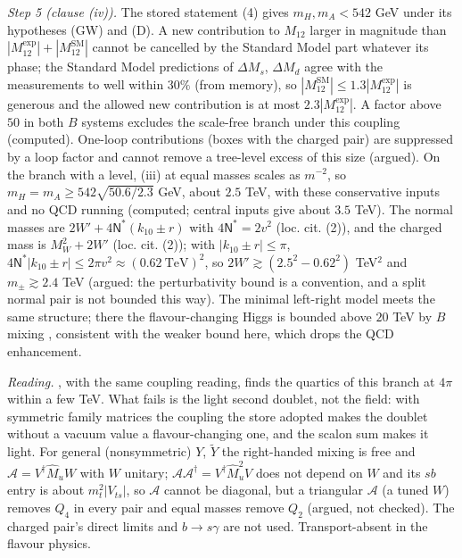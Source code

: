 \emph{Step 5 (clause (iv)).} The stored statement (4) gives $m_{H}, m_{A} < 542$ GeV under its hypotheses (GW) and (D). A new contribution to $M_{12}$ larger in magnitude than $|M_{12}^{\mathrm{exp}}| + |M_{12}^{\mathrm{SM}}|$ cannot be cancelled by the Standard Model part whatever its phase; the Standard Model predictions of $\Delta M_{s}$, $\Delta M_{d}$ agree with the measurements to well within $30\%$ (from memory), so $|M_{12}^{\mathrm{SM}}| \le 1.3|M_{12}^{\mathrm{exp}}|$ is generous and the allowed new contribution is at most $2.3|M_{12}^{\mathrm{exp}}|$. A factor above $50$ in both $B$ systems excludes the scale-free branch under this coupling (computed). One-loop contributions (boxes with the charged pair) are suppressed by a loop factor and cannot remove a tree-level excess of this size (argued). On the branch with a level, (iii) at equal masses scales as $m^{-2}$, so $m_{H} = m_{A} \ge 542\sqrt{50.6/2.3}$ GeV, about $2.5$ TeV, with these conservative inputs and no QCD running (computed; central inputs give about $3.5$ TeV). The normal masses are $2W' + 4\mathsf{N}^{*}(k_{10} \pm r)$ with $4\mathsf{N}^{*} = 2v^{2}$ (loc. cit. (2)), and the charged mass is $M_{W}^{2} + 2W'$ (loc. cit. (2)); with $|k_{10} \pm r| \le \pi$, $4\mathsf{N}^{*}|k_{10} \pm r| \le 2\pi v^{2} \approx (0.62\ \mathrm{TeV})^{2}$, so $2W' \gtrsim (2.5^{2} - 0.62^{2})$ TeV$^{2}$ and $m_{\pm} \gtrsim 2.4$ TeV (argued: the perturbativity bound is a convention, and a split normal pair is not bounded this way). The minimal left-right model meets the same structure; there the flavour-changing Higgs is bounded above $20$ TeV by $B$ mixing \cite{BertoliniMaiezzaNesti2014}, consistent with the weaker bound here, which drops the QCD enhancement.

\emph{Reading.} , with the same coupling reading, finds the quartics of this branch at $4\pi$ within a few TeV. What fails is the light second doublet, not the field: with symmetric family matrices the coupling the store adopted makes the doublet without a vacuum value a flavour-changing one, and the scalon sum makes it light. For general (nonsymmetric) $Y$, $\tilde{Y}$ the right-handed mixing is free and $\mathcal{A} = V^{\dagger}\hat{M}_{u}W$ with $W$ unitary; $\mathcal{A}\mathcal{A}^{\dagger} = V^{\dagger}\hat{M}_{u}^{2}V$ does not depend on $W$ and its $sb$ entry is about $m_{t}^{2}|V_{ts}|$, so $\mathcal{A}$ cannot be diagonal, but a triangular $\mathcal{A}$ (a tuned $W$) removes $Q_{4}$ in every pair and equal masses remove $Q_{2}$ (argued, not checked). The charged pair's direct limits and $b \to s\gamma$ are not used. Transport-absent in the flavour physics.
